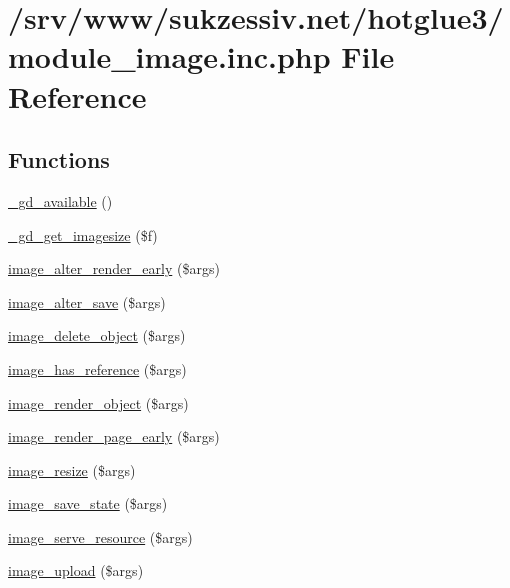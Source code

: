 \hypertarget{module__image_8inc_8php}{
\section{/srv/www/sukzessiv.net/hotglue3/module\_\-image.inc.php File Reference}
\label{module__image_8inc_8php}
}
\subsection*{Functions}
\begin{CompactItemize}
\item 
\hyperlink{module__image_8inc_8php_574d6d760e50b88ffa815cab30a5e634}{\_\-gd\_\-available} ()
\item 
\hyperlink{module__image_8inc_8php_3c76028c34273e722c9691243377a208}{\_\-gd\_\-get\_\-imagesize} (\$f)
\item 
\hyperlink{module__image_8inc_8php_b52d6b71a5c26dbb7e86653652a23251}{image\_\-alter\_\-render\_\-early} (\$args)
\item 
\hyperlink{module__image_8inc_8php_93578776fb38b10d47bc711cc3469ae9}{image\_\-alter\_\-save} (\$args)
\item 
\hyperlink{module__image_8inc_8php_7cbcf6138ccff16a8b733cfd6f0f1666}{image\_\-delete\_\-object} (\$args)
\item 
\hyperlink{module__image_8inc_8php_0bef6164f5eafe368d251639cf6fe298}{image\_\-has\_\-reference} (\$args)
\item 
\hyperlink{module__image_8inc_8php_4fadded2a225d1b5ea73404a84597620}{image\_\-render\_\-object} (\$args)
\item 
\hyperlink{module__image_8inc_8php_8266a74a11a86a73e2aa3709388fd43f}{image\_\-render\_\-page\_\-early} (\$args)
\item 
\hyperlink{module__image_8inc_8php_9e03a71310133176236ae0bd4a0241e0}{image\_\-resize} (\$args)
\item 
\hyperlink{module__image_8inc_8php_c26ea1448f0b7ed835907cf7c22b60ca}{image\_\-save\_\-state} (\$args)
\item 
\hyperlink{module__image_8inc_8php_bb6646bfaa6a012e620cdaaa0bc3c807}{image\_\-serve\_\-resource} (\$args)
\item 
\hyperlink{module__image_8inc_8php_37dee9de60e2852c0631d8e60e58585c}{image\_\-upload} (\$args)
\end{CompactItemize}


